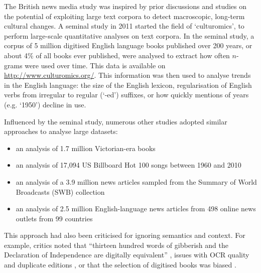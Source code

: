 \documentclass{report}
\begin{document}
The British news media study was inspired by prior discussions and studies on the potential of exploiting large text corpora to detect macroscopic, long-term cultural changes. 
A seminal study in 2011 \cite{michel2011quantitative} started the field of `culturomics', to perform large-scale quantitative analyses on text corpora.
In the seminal study, a corpus of 5 million digitised English language books published over 200 years, or about 4\% of all books ever published, were analysed to extract how often $n$-grams were used over time.
This data is available on \url{http://www.culturomics.org/}.
This information was then used to analyse trends in the English language: the size of the English lexicon, regularisation of English verbs from irregular to regular (`-ed') suffixes, or how quickly mentions of years (e.g. `1950') decline in use.

Influenced by the seminal study, numerous other studies adopted similar approaches to analyse large datasets: 
\begin{itemize}
	\item an analysis of 1.7 million Victorian-era books \cite{gibbs2011conversation}
	\item an analysis of 17,094 US Billboard Hot 100 songs between 1960 and 2010 \cite{mauch2015evolution}
	\item an analysis of a 3.9 million news articles sampled from the Summary of World Broadcasts (SWB) collection \cite{leetaru2011culturomics}
	\item an analysis of 2.5 million English-language news articles from 498 online news outlets from 99 countries \cite{flaounas2013research}
\end{itemize}

This approach had also been criticised for ignoring semantics and context.
For example, critics noted that ``thirteen hundred words of gibberish and the Declaration of Independence are digitally equivalent'' \cite{gooding2013mass}, issues with OCR quality and duplicate editions \cite{gooding2013mass}, or that the selection of digitised books was biased \cite{schwartz2011culturomics}.
\end{document}
